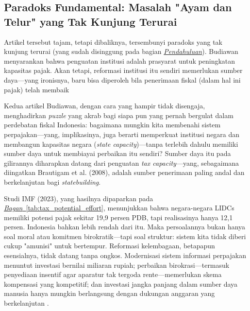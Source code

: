 \subsection{Paradoks Fundamental: Masalah "Ayam dan Telur" yang Tak Kunjung Terurai}

Artikel tersebut tajam, tetapi dibaliknya, tersembunyi paradoks yang tak kunjung terurai (yang sudah disinggung pada bagian \hyperref[sec:Pendahuluan]{\textit{Pendahuluan}}). Budiawan menyarankan bahwa penguatan institusi adalah prasyarat untuk peningkatan kapasitas pajak. Akan tetapi, reformasi institusi itu sendiri memerlukan sumber daya—yang ironisnya, baru bisa diperoleh bila penerimaan fiskal (dalam hal ini pajak) telah membaik

Kedua artikel Budiawan, dengan cara yang hampir tidak disengaja, menghadirkan \textit{puzzle} yang akrab bagi siapa pun yang pernah bergulat dalam perdebatan fiskal Indonesia: bagaimana mungkin kita membenahi sistem perpajakan—yang, implikasinya, juga berarti memperkuat institusi negara dan membangun kapasitas negara (\textit{state capacity})—tanpa terlebih dahulu memiliki sumber daya untuk membiayai perbaikan itu sendiri? Sumber daya itu pada gilirannya diharapkan datang dari penguatan \textit{tax capacity}—yang, sebagaimana diingatkan Brautigam et al. (2008), adalah sumber penerimaan paling andal dan berkelanjutan bagi \textit{statebuilding}.  

Studi IMF (2023), yang hasilnya dipaparkan pada \hyperref[tab:tab:tax_potential_effort]{\textit{Bagan}~\ref{tab:tax_potential_effort}}, menunjukkan bahwa negara-negara LIDCs memiliki potensi pajak sekitar 19,9 persen PDB, tapi realisasinya hanya 12,1 persen. Indonesia bahkan lebih rendah dari itu. Maka persoalannya bukan hanya soal moral atau komitmen birokratik—tapi soal struktur: sistem kita tidak diberi cukup "amunisi" untuk bertempur. Reformasi kelembagaan, betapapun esensialnya, tidak datang tanpa ongkos. Modernisasi sistem informasi perpajakan menuntut investasi bernilai miliaran rupiah; perbaikan birokrasi—termasuk penyediaan insentif agar aparatur tak tergoda rente—memerlukan skema kompensasi yang kompetitif; dan investasi jangka panjang dalam sumber daya manusia hanya mungkin berlangsung dengan dukungan anggaran yang berkelanjutan \citep{chang_2011_institutions}.  

